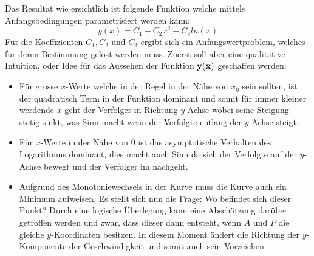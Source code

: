 Das Resultat wie ersichtlich ist folgende Funktion welche mittels Anfangsbedingungen parametrisiert werden kann: 
\begin{equation}
	y(x)
	=
	C_1 + C_2 x^2 - C_3 ln(x)
	\label{lambertw:funkLoes}
\end{equation}
Für die Koeffizienten \(C_1, C_2\) und \(C_3\) ergibt sich ein Anfangswertproblem, welches für deren Bestimmung gelöst werden muss. Zuerst soll aber eine qualitative Intuition, oder Idee für das Aussehen der Funktion \(\bf{y(x)}\) geschaffen werden:
\begin{itemize}
	\item
	Für grosse \(x\)-Werte welche in der Regel in der Nähe von \(x_0\) sein sollten, ist der quadratisch Term in der Funktion dominant und somit für immer kleiner werdende \(x\) geht der Verfolger in Richtung \(y\)-Achse wobei seine Steigung stetig sinkt, was Sinn macht wenn der Verfolgte entlang der \(y\)-Achse steigt.
	\item
	Für \(x\)-Werte in der Nähe von \(0\) ist das asymptotische Verhalten des Logarithmus dominant, dies macht auch Sinn da sich der Verfolgte auf der \(y\)-Achse bewegt und der Verfolger im nachgeht.
	\item
	Aufgrund des Monotoniewechsels in der Kurve muss die Kurve auch ein Minimum aufweisen. Es stellt sich nun die Frage: Wo befindet sich dieser Punkt? Durch eine logische Überlegung kann eine Abschätzung darüber getroffen werden und zwar, dass dieser dann entsteht, wenn \(A\) und \(P\) die gleiche \(y\)-Koordinaten besitzen. In diesem Moment ändert die Richtung der \(y\)-Komponente der Geschwindigkeit und somit auch sein Vorzeichen.
\end{itemize}
